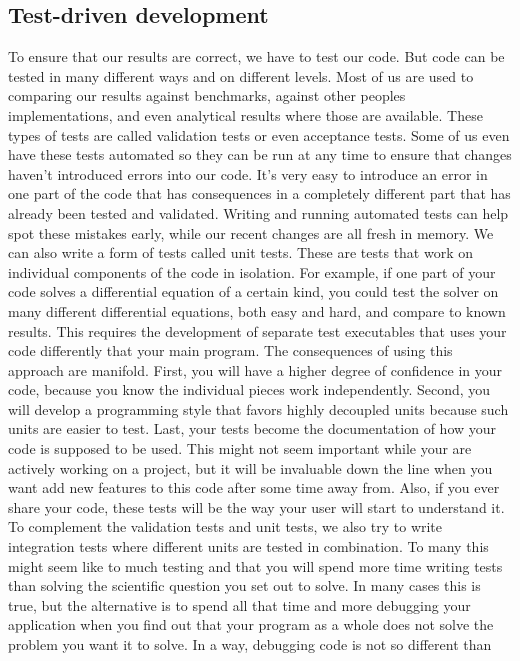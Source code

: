\subsection{Test-driven development}
To ensure that our results are correct, we have to test our code. But code can
be tested in many different ways and on different levels. Most of us are used to
comparing our results against benchmarks, against other peoples implementations,
and even analytical results where those are available. These types of tests are
called validation tests or even acceptance tests. Some of us even have these
tests automated so they can be run at any time to ensure that changes haven't
introduced errors into our code. It's very easy to introduce an error in one
part of the code that has consequences in a completely different part that has
already been tested and validated. Writing and running automated tests can help
spot these mistakes early, while our recent changes are all fresh in memory. 
We can also write a form of tests called unit tests. These are tests that work
on individual components of the code in isolation. For example, if one part of
your code solves a differential equation of a certain kind, you could test the
solver on many different differential equations, both easy and hard, and compare
to known results. This requires the development of separate test executables
that uses your code differently that your main program. The consequences of
using this approach are manifold. First, you will have a higher degree of
confidence in your code, because you  know the individual pieces work
independently. Second, you will develop a programming style that favors highly
decoupled units because such units are easier to test. Last, your tests become
the documentation of how your code is supposed to be used. This might not seem
important while your are actively working on a project, but it will be
invaluable down the line when you want add new features to this code after some
time away from. Also, if you ever share your code, these tests will be the way
your user will start to understand it.
To complement the validation tests and unit tests, we also try to write
integration tests where different units are tested in combination. To many this
might seem like to much testing and that you will spend more time writing tests
than solving the scientific question you set out to solve. In many cases this is
true, but the alternative is to spend all that time and more debugging your
application when you find out that your program as a whole does not solve the
problem you want it to solve. In a way, debugging code is not so different than
